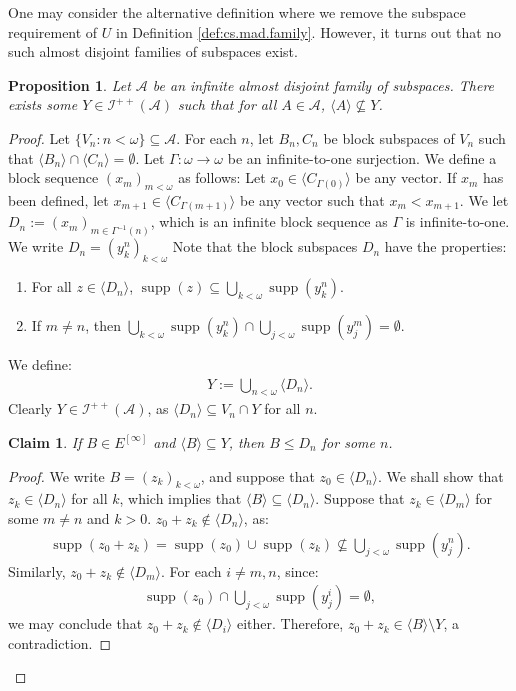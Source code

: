 \documentclass[10pt,a4paper]{amsart}
\theoremstyle{plain}
\numberwithin{equation}{section}
\newtheorem{proposition}[theorem]{Proposition}
\newtheorem{claim}{Claim}
\theoremstyle{definition}
\newcommand{\func}{\operatorname}
\renewcommand{\c}[1]{\langle #1 \rangle}
\newcommand{\cal}{\mathcal}
\newcommand{\supp}{\func{supp}}
\newcommand{\A}{\cal{A}}
\newcommand{\I}{\cal{I}}
\newenvironment{midproof}[1][Proof]
  {\begin{proof}[#1]\renewcommand{\qedsymbol}{$\blacksquare$}}
  {\end{proof}}
\begin{document}
One may consider the alternative definition where we remove the subspace requirement of $U$ in Definition \ref{def:cs.mad.family}. However, it turns out that no such almost disjoint families of subspaces exist.

\begin{proposition}
    Let $\A$ be an infinite almost disjoint family of subspaces. There exists some $Y \in \I^{++}(\A)$ such that for all $A \in \A$, $\c{A} \not\subseteq Y$.
\end{proposition}

\begin{proof}
    Let $\{V_n : n < \omega\} \subseteq \A$. For each $n$, let $B_n,C_n$ be block subspaces of $V_n$ such that $\c{B_n} \cap \c{C_n} = \emptyset$. Let $\Gamma : \omega \to \omega$ be an infinite-to-one surjection. We define a block sequence $(x_m)_{m<\omega}$ as follows: Let $x_0 \in \c{C_{\Gamma(0)}}$ be any vector. If $x_m$ has been defined, let $x_{m+1} \in \c{C_{\Gamma(m+1)}}$ be any vector such that $x_m < x_{m+1}$. We let $D_n := (x_m)_{m \in \Gamma^{-1}(n)}$, which is an infinite block sequence as $\Gamma$ is infinite-to-one. We write $D_n = (y_k^n)_{k<\omega}$ Note that the block subspaces $D_n$ have the properties: 
    \begin{enumerate}
        \item For all $z \in \c{D_n}$, $\supp(z) \subseteq \bigcup_{k<\omega} \supp(y_k^n)$.
        
        \item If $m \neq n$, then $\bigcup_{k<\omega} \supp(y_k^n) \cap \bigcup_{j<\omega} \supp(y_j^m) = \emptyset$.
    \end{enumerate}
    We define:
    \begin{align*}
        Y := \bigcup_{n<\omega} \c{D_n}.
    \end{align*}
    Clearly $Y \in \I^{++}(\A)$, as $\c{D_n} \subseteq V_n \cap Y$ for all $n$. 

    \begin{claim}
        If $B \in E^{[\infty]}$ and $\c{B} \subseteq Y$, then $B \leq D_n$ for some $n$.
    \end{claim}

    \begin{midproof}
        We write $B = (z_k)_{k<\omega}$, and suppose that $z_0 \in \c{D_n}$. We shall show that $z_k \in \c{D_n}$ for all $k$, which implies that $\c{B} \subseteq \c{D_n}$. Suppose that $z_k \in \c{D_m}$ for some $m \neq n$ and $k > 0$. $z_0 + z_k \notin \c{D_n}$, as:
        \begin{align*}
            \supp(z_0 + z_k) = \supp(z_0) \cup \supp(z_k) \not\subseteq \bigcup_{j<\omega} \supp(y_j^n).
        \end{align*}
        Similarly, $z_0 + z_k \notin \c{D_m}$. For each $i \neq m,n$, since:
        \begin{align*}
            \supp(z_0) \cap \bigcup_{j<\omega} \supp(y_j^i) = \emptyset,
        \end{align*}
        we may conclude that $z_0 + z_k \notin \c{D_i}$ either. Therefore, $z_0 + z_k \in \c{B} \setminus Y$, a contradiction.
    \end{midproof}


\end{proof}
\end{document}
